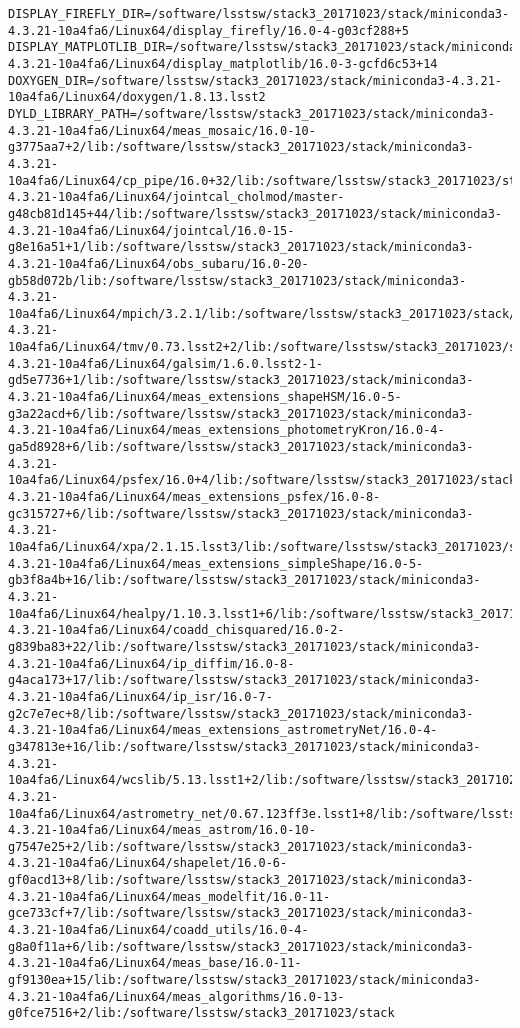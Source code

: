 \begin{verbatim}
DISPLAY_FIREFLY_DIR=/software/lsstsw/stack3_20171023/stack/miniconda3-4.3.21-10a4fa6/Linux64/display_firefly/16.0-4-g03cf288+5
DISPLAY_MATPLOTLIB_DIR=/software/lsstsw/stack3_20171023/stack/miniconda3-4.3.21-10a4fa6/Linux64/display_matplotlib/16.0-3-gcfd6c53+14
DOXYGEN_DIR=/software/lsstsw/stack3_20171023/stack/miniconda3-4.3.21-10a4fa6/Linux64/doxygen/1.8.13.lsst2
DYLD_LIBRARY_PATH=/software/lsstsw/stack3_20171023/stack/miniconda3-4.3.21-10a4fa6/Linux64/meas_mosaic/16.0-10-g3775aa7+2/lib:/software/lsstsw/stack3_20171023/stack/miniconda3-4.3.21-10a4fa6/Linux64/cp_pipe/16.0+32/lib:/software/lsstsw/stack3_20171023/stack/miniconda3-4.3.21-10a4fa6/Linux64/jointcal_cholmod/master-g48cb81d145+44/lib:/software/lsstsw/stack3_20171023/stack/miniconda3-4.3.21-10a4fa6/Linux64/jointcal/16.0-15-g8e16a51+1/lib:/software/lsstsw/stack3_20171023/stack/miniconda3-4.3.21-10a4fa6/Linux64/obs_subaru/16.0-20-gb58d072b/lib:/software/lsstsw/stack3_20171023/stack/miniconda3-4.3.21-10a4fa6/Linux64/mpich/3.2.1/lib:/software/lsstsw/stack3_20171023/stack/miniconda3-4.3.21-10a4fa6/Linux64/tmv/0.73.lsst2+2/lib:/software/lsstsw/stack3_20171023/stack/miniconda3-4.3.21-10a4fa6/Linux64/galsim/1.6.0.lsst2-1-gd5e7736+1/lib:/software/lsstsw/stack3_20171023/stack/miniconda3-4.3.21-10a4fa6/Linux64/meas_extensions_shapeHSM/16.0-5-g3a22acd+6/lib:/software/lsstsw/stack3_20171023/stack/miniconda3-4.3.21-10a4fa6/Linux64/meas_extensions_photometryKron/16.0-4-ga5d8928+6/lib:/software/lsstsw/stack3_20171023/stack/miniconda3-4.3.21-10a4fa6/Linux64/psfex/16.0+4/lib:/software/lsstsw/stack3_20171023/stack/miniconda3-4.3.21-10a4fa6/Linux64/meas_extensions_psfex/16.0-8-gc315727+6/lib:/software/lsstsw/stack3_20171023/stack/miniconda3-4.3.21-10a4fa6/Linux64/xpa/2.1.15.lsst3/lib:/software/lsstsw/stack3_20171023/stack/miniconda3-4.3.21-10a4fa6/Linux64/meas_extensions_simpleShape/16.0-5-gb3f8a4b+16/lib:/software/lsstsw/stack3_20171023/stack/miniconda3-4.3.21-10a4fa6/Linux64/healpy/1.10.3.lsst1+6/lib:/software/lsstsw/stack3_20171023/stack/miniconda3-4.3.21-10a4fa6/Linux64/coadd_chisquared/16.0-2-g839ba83+22/lib:/software/lsstsw/stack3_20171023/stack/miniconda3-4.3.21-10a4fa6/Linux64/ip_diffim/16.0-8-g4aca173+17/lib:/software/lsstsw/stack3_20171023/stack/miniconda3-4.3.21-10a4fa6/Linux64/ip_isr/16.0-7-g2c7e7ec+8/lib:/software/lsstsw/stack3_20171023/stack/miniconda3-4.3.21-10a4fa6/Linux64/meas_extensions_astrometryNet/16.0-4-g347813e+16/lib:/software/lsstsw/stack3_20171023/stack/miniconda3-4.3.21-10a4fa6/Linux64/wcslib/5.13.lsst1+2/lib:/software/lsstsw/stack3_20171023/stack/miniconda3-4.3.21-10a4fa6/Linux64/astrometry_net/0.67.123ff3e.lsst1+8/lib:/software/lsstsw/stack3_20171023/stack/miniconda3-4.3.21-10a4fa6/Linux64/meas_astrom/16.0-10-g7547e25+2/lib:/software/lsstsw/stack3_20171023/stack/miniconda3-4.3.21-10a4fa6/Linux64/shapelet/16.0-6-gf0acd13+8/lib:/software/lsstsw/stack3_20171023/stack/miniconda3-4.3.21-10a4fa6/Linux64/meas_modelfit/16.0-11-gce733cf+7/lib:/software/lsstsw/stack3_20171023/stack/miniconda3-4.3.21-10a4fa6/Linux64/coadd_utils/16.0-4-g8a0f11a+6/lib:/software/lsstsw/stack3_20171023/stack/miniconda3-4.3.21-10a4fa6/Linux64/meas_base/16.0-11-gf9130ea+15/lib:/software/lsstsw/stack3_20171023/stack/miniconda3-4.3.21-10a4fa6/Linux64/meas_algorithms/16.0-13-g0fce7516+2/lib:/software/lsstsw/stack3_20171023/stack
\end{verbatim}
